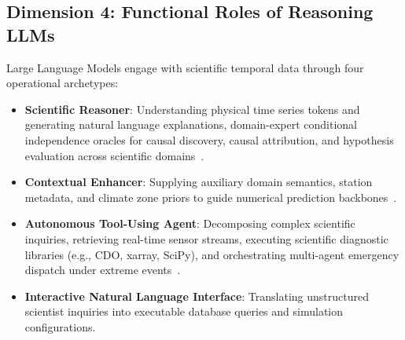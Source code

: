 \subsection{Dimension 4: Functional Roles of Reasoning LLMs}
Large Language Models engage with scientific temporal data through four operational archetypes:
\begin{itemize}
    \item \textbf{Scientific Reasoner}: Understanding physical time series tokens and generating natural language explanations, domain-expert conditional independence oracles for causal discovery, causal attribution, and hypothesis evaluation across scientific domains~\cite{wu2025scits,deng2024k2,kuckreja2024geochat,cohrs2024llmcausal,wahl2023groupcausal}.
    \item \textbf{Contextual Enhancer}: Supplying auxiliary domain semantics, station metadata, and climate zone priors to guide numerical prediction backbones~\cite{li2025climatellm,goswami2024moment}.
    \item \textbf{Autonomous Tool-Using Agent}: Decomposing complex scientific inquiries, retrieving real-time sensor streams, executing scientific diagnostic libraries (e.g., CDO, xarray, SciPy), and orchestrating multi-agent emergency dispatch under extreme events~\cite{li2025climateagent,bi2024oceangpt,ji2025entropy}.
    \item \textbf{Interactive Natural Language Interface}: Translating unstructured scientist inquiries into executable database queries and simulation configurations.
\end{itemize}
